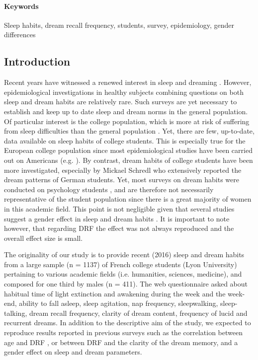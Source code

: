 \paragraph{Keywords}
Sleep habits, dream recall frequency, students, survey, epidemiology, gender differences

\subsection*{Introduction}
\label{res:survey:intro}

Recent years have witnessed a renewed interest in sleep and dreaming \citep{dijk_dreaming_2015}. However, epidemiological investigations in healthy subjects combining questions on both sleep and dream habits are relatively rare. Such surveys are yet necessary to establish and keep up to date sleep and dream norms in the general population. Of particular interest is the college population, which is more at risk of suffering from sleep difficulties than the general population \citep{buboltz_sleep_2001, curcio_sleep_2006, forquer_sleep_2008, lund_sleep_2010}. Yet, there are few, up-to-date, data available on sleep habits of college students. This is especially true for the European college population since most epidemiological studies have been carried out on Americans (e.g. \citealp{lund_sleep_2010}). By contrast, dream habits of college students have been more investigated, especially by Mickael Schredl who extensively reported the dream patterns of German students. Yet, most surveys on dream habits were conducted on psychology students \citep{schredl_factors_2003}, and are therefore not necessarily representative of the student population since there is a great majority of women in this academic field. This point is not negligible given that several studies suggest a gender effect in sleep and dream habits \citep{beck_insomnia_2013, schredl_gender_2008}. It is important to note however, that regarding DRF the effect was not always reproduced and the overall effect size is small.

The originality of our study is to provide recent (2016) sleep and dream habits from a large sample (n = 1137) of French college students (Lyon University) pertaining to various academic fields (i.e. humanities, sciences, medicine), and composed for one third by males (n = 411). The web questionnaire asked about habitual time of light extinction and awakening during the week and the week-end, ability to fall asleep, sleep agitation, nap frequency, sleepwalking, sleep-talking, dream recall frequency, clarity of dream content, frequency of lucid and recurrent dreams. In addition to the descriptive aim of the study, we expected to reproduce results reported in previous surveys such as the correlation between age and DRF \citep{schredl_dream_2008}, or between DRF and the clarity of the dream memory, and a gender effect on sleep and dream parameters.


